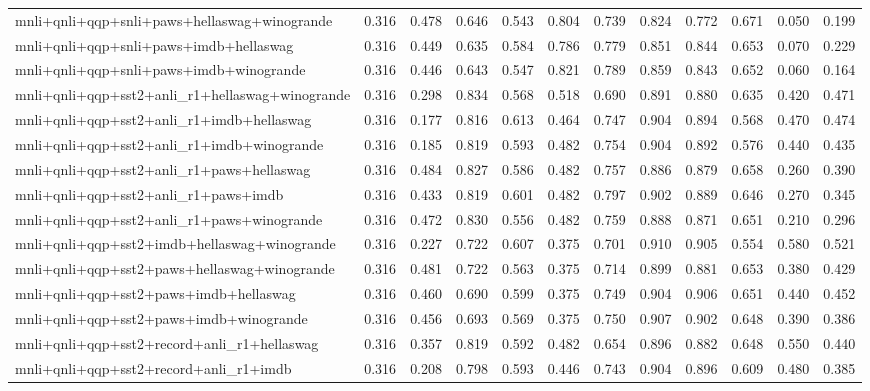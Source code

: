 \begin{table}[t]
\begin{tabular}{lrrrrrrrrrrr}
    mnli+qnli+qqp+snli+paws+hellaswag+winogrande & 0.316 & 0.478 & 0.646 & 0.543 & 0.804 & 0.739 & 0.824 & 0.772 & 0.671 & 0.050 & 0.199 \\
    mnli+qnli+qqp+snli+paws+imdb+hellaswag & 0.316 & 0.449 & 0.635 & 0.584 & 0.786 & 0.779 & 0.851 & 0.844 & 0.653 & 0.070 & 0.229 \\
    mnli+qnli+qqp+snli+paws+imdb+winogrande & 0.316 & 0.446 & 0.643 & 0.547 & 0.821 & 0.789 & 0.859 & 0.843 & 0.652 & 0.060 & 0.164 \\
    mnli+qnli+qqp+sst2+anli\_r1+hellaswag+winogrande & 0.316 & 0.298 & 0.834 & 0.568 & 0.518 & 0.690 & 0.891 & 0.880 & 0.635 & 0.420 & 0.471 \\
    mnli+qnli+qqp+sst2+anli\_r1+imdb+hellaswag & 0.316 & 0.177 & 0.816 & 0.613 & 0.464 & 0.747 & 0.904 & 0.894 & 0.568 & 0.470 & 0.474 \\
    mnli+qnli+qqp+sst2+anli\_r1+imdb+winogrande & 0.316 & 0.185 & 0.819 & 0.593 & 0.482 & 0.754 & 0.904 & 0.892 & 0.576 & 0.440 & 0.435 \\
    mnli+qnli+qqp+sst2+anli\_r1+paws+hellaswag & 0.316 & 0.484 & 0.827 & 0.586 & 0.482 & 0.757 & 0.886 & 0.879 & 0.658 & 0.260 & 0.390 \\
    mnli+qnli+qqp+sst2+anli\_r1+paws+imdb & 0.316 & 0.433 & 0.819 & 0.601 & 0.482 & 0.797 & 0.902 & 0.889 & 0.646 & 0.270 & 0.345 \\
    mnli+qnli+qqp+sst2+anli\_r1+paws+winogrande & 0.316 & 0.472 & 0.830 & 0.556 & 0.482 & 0.759 & 0.888 & 0.871 & 0.651 & 0.210 & 0.296 \\
    mnli+qnli+qqp+sst2+imdb+hellaswag+winogrande & 0.316 & 0.227 & 0.722 & 0.607 & 0.375 & 0.701 & 0.910 & 0.905 & 0.554 & 0.580 & 0.521 \\
    mnli+qnli+qqp+sst2+paws+hellaswag+winogrande & 0.316 & 0.481 & 0.722 & 0.563 & 0.375 & 0.714 & 0.899 & 0.881 & 0.653 & 0.380 & 0.429 \\
    mnli+qnli+qqp+sst2+paws+imdb+hellaswag & 0.316 & 0.460 & 0.690 & 0.599 & 0.375 & 0.749 & 0.904 & 0.906 & 0.651 & 0.440 & 0.452 \\
    mnli+qnli+qqp+sst2+paws+imdb+winogrande & 0.316 & 0.456 & 0.693 & 0.569 & 0.375 & 0.750 & 0.907 & 0.902 & 0.648 & 0.390 & 0.386 \\
    mnli+qnli+qqp+sst2+record+anli\_r1+hellaswag & 0.316 & 0.357 & 0.819 & 0.592 & 0.482 & 0.654 & 0.896 & 0.882 & 0.648 & 0.550 & 0.440 \\
    mnli+qnli+qqp+sst2+record+anli\_r1+imdb & 0.316 & 0.208 & 0.798 & 0.593 & 0.446 & 0.743 & 0.904 & 0.896 & 0.609 & 0.480 & 0.385 \\

\end{tabular}
\end{table}

